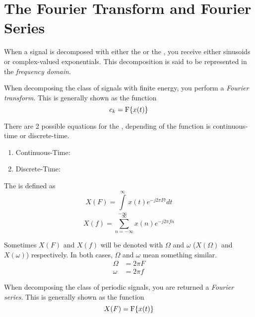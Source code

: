 \section{The Fourier Transform and Fourier Series}\label{sec:FourierTransformSeries}
When a signal is decomposed with either the  or the , you receive either sinusoids or complex-valued exponentials.
This decomposition is said to be represented in the \emph{frequency domain}.

\begin{definition}\label{def:FourierTransform}
  When decomposing the class of signals with finite energy, you perform a \emph{Fourier transform}.
  This is generally shown as the function
  \begin{equation*}
    c_{k} = \operatorname{F} \lbrace x(t) \rbrace
  \end{equation*}

  There are 2 possible equations for the , depending of the function is continuous-time or discrete-time.
  \begin{enumerate}[noitemsep]
  \item Continuous-Time: 
  \item Discrete-Time: 
  \end{enumerate}
  
  The  is defined as
  \begin{equation}\label{eq:FourierTransform-Continuous}
    X(F) = \int\limits_{-\infty}^{\infty} x(t) e^{-j 2 \pi F t} dt
  \end{equation}
  \begin{equation}\label{eq:FourierTransform-Discrete}
    X(f) = \sum\limits_{n=-\infty}^{\infty} x(n) e^{-j 2 \pi f n}
  \end{equation}
  \begin{remark}
    Sometimes $X(F)$ and $X(f)$ will be denoted with $\Omega$ and $\omega$ ($X(\Omega)$ and $X(\omega)$) respectively.
    In both cases, $\Omega$ and $\omega$ mean something similar.
    \begin{align*}
      \Omega &= 2 \pi F \\
      \omega &= 2 \pi f
    \end{align*}
  \end{remark}
\end{definition}
\begin{definition}\label{def:FourierSeries}
  When decomposing the class of periodic signals, you are returned a \emph{Fourier series}.
  This is generally shown as the function
  \begin{equation*}
    X(F) = \operatorname{F} \lbrace x(t) \rbrace
  \end{equation*}
\end{definition}

